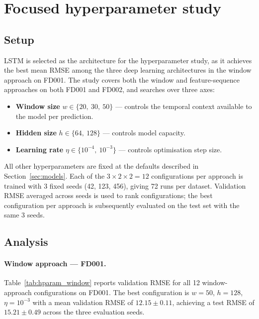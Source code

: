 \documentclass[a4paper,11pt]{article}
\begin{document}
\section{Focused hyperparameter study}
\label{sec:hparam}

\subsection{Setup}

LSTM is selected as the architecture for the hyperparameter study, as it achieves the best mean RMSE among the three deep learning architectures in the window approach on FD001.
The study covers both the window and feature-sequence approaches on both FD001 and FD002, and searches over three axes:
\begin{itemize}
    \item \textbf{Window size} $w \in \{20,\ 30,\ 50\}$ — controls the temporal context available to the model per prediction.
    \item \textbf{Hidden size} $h \in \{64,\ 128\}$ — controls model capacity.
    \item \textbf{Learning rate} $\eta \in \{10^{-4},\ 10^{-3}\}$ — controls optimisation step size.
\end{itemize}
All other hyperparameters are fixed at the defaults described in Section~\ref{sec:models}.
Each of the $3 \times 2 \times 2 = 12$ configurations per approach is trained with 3 fixed seeds (42, 123, 456), giving 72 runs per dataset.
Validation RMSE averaged across seeds is used to rank configurations; the best configuration per approach is subsequently evaluated on the test set with the same 3 seeds.

\subsection{Analysis}

\paragraph{Window approach — FD001.}
Table~\ref{tab:hparam_window} reports validation RMSE for all 12 window-approach configurations on FD001.
The best configuration is $w=50$, $h=128$, $\eta=10^{-3}$ with a mean validation RMSE of $12.15 \pm 0.11$, achieving a test RMSE of $15.21 \pm 0.49$ across the three evaluation seeds.
\end{document}
